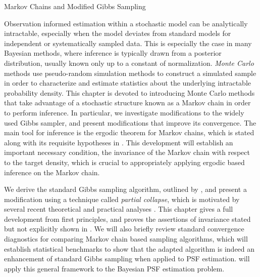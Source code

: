 \setlength{\parindent}{2ex}
\newcommand{\Ab}{{\bf A}}
\newcommand{\N}{\mathcal{N}}
\begin{chapter}{Markov Chains and Modified Gibbs Sampling}\label{chapter:mcmctheory}

Observation informed estimation within a stochastic model can be analytically intractable, especially when the model deviates from standard models for independent or systematically sampled data.
This is especially the case in many Bayesian methods, where inference is typically drawn from a posterior distribution, usually known only up to a constant of normalization.
\emph{Monte Carlo} methods use pseudo-random simulation methods to construct a simulated sample in order to characterize and estimate statistics about the underlying intractable probability density.
This chapter is devoted to introducing Monte Carlo methods that take advantage of a stochastic structure known as a Markov chain in order to perform inference.
In particular, we investigate modifications to the widely used Gibbs sampler, and present modifications that improve its convergence.
The main tool for inference is the ergodic theorem for Markov chains, which is stated along with its requisite hypotheses in .
This development will establish an important necessary condition, the invariance of the Markov chain with respect to the target density, which is crucial to appropriately applying ergodic based inference on the Markov chain.

We derive the standard Gibbs sampling algorithm, outlined by \citep{geman1984stochastic}, and present a modification using a technique called \emph{partial collapse}, which is motivated by several recent theoretical and practical analyses \citep{van2008partially,agapiou2014analysis,fox2015fast}.
This chapter gives a full development from first principles, and proves the assertions of invariance stated but not explicitly shown in \citep{van2008partially}.
We will also briefly review standard convergence diagnostics for comparing Markov chain based sampling algorithms, which will establish statistical benchmarks to show that the adapted algorithm is indeed an enhancement of standard Gibbs sampling when applied to PSF estimation.  
 will apply this general framework to the Bayesian PSF estimation problem.


\end{chapter}
